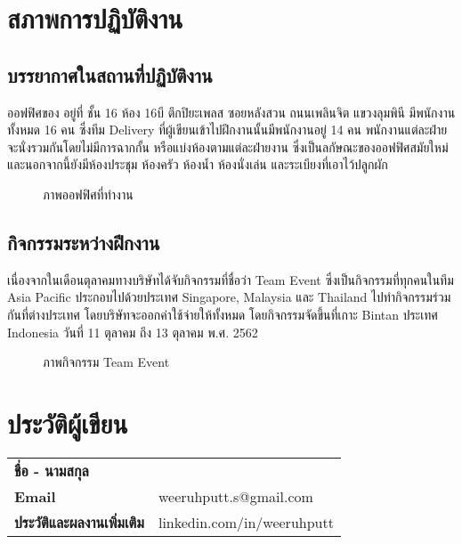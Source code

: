 \chapter{สภาพการปฏิบัติงาน}

\section{บรรยากาศในสถานที่ปฏิบัติงาน}

ออฟฟิศของ \Company อยู่ที่ ชั้น 16 ห้อง 16บี ตึกปิยะเพลส ซอยหลังสวน ถนนเพลินจิต แขวงลุมพินี มีพนักงานทั้งหมด 16 คน ซึ่งทีม Delivery ที่ผู้เขียนเข้าไปฝึกงานนั้นมีพนักงานอยู่ 14 คน พนักงานแต่ละฝ่ายจะนั่งรวมกันโดยไม่มีการฉากกั้น หรือแบ่งห้องตามแต่ละฝ่ายงาน ซึ่งเป็นลกัษณะของออฟฟิศสมัยใหม่ และนอกจากนี้ยังมีห้องประชุม ห้องครัว ห้องน้ำ ห้องนั่งเล่น และระเบียงที่เอาไว้ปลูกผัก

\begin{figure}[!h]
    \centering
    \caption{ภาพออฟฟิศที่ทำงาน}
    \label{Fig:office}
\end{figure}

\section{กิจกรรมระหว่างฝึกงาน}

เนื่องจากในเดือนตุลาคมทางบริษัทได้จับกิจกรรมที่ชื่อว่า Team Event ซึ่งเป็นกิจกรรมที่ทุกคนในทีม Asia Pacific ประกอบไปด้วยประเทศ Singapore, Malaysia และ Thailand ไปทำกิจกรรมร่วมกันที่ต่างประเทศ โดยบริษัทจะออกค่าใช้จ่ายให้ทั้งหมด โดยกิจกรรมจัดขึ้นที่เกาะ Bintan ประเทศ Indonesia วันที่ 11 ตุลาคม ถึง 13 ตุลาคม พ.ศ. 2562

\begin{figure}[!h]
	\centering
	\caption{ภาพกิจกรรม Team Event}
	\label{Fig:teamevent}
\end{figure}

\chapter{ประวัติผู้เขียน}

\begin{flushleft}
\begin{tabular}{l l}
	\textbf{ชื่อ - นามสกุล} & \AuName \\
	\textbf{Email} & weeruhputt.s@gmail.com \\
	\textbf{ประวัติและผลงานเพิ่มเติม} & linkedin.com/in/weeruhputt \\
\end{tabular}

\end{flushleft}
